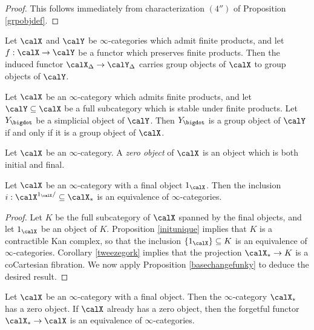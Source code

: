 \begin{proof}
This follows immediately from characterization $(4'')$ of Proposition \ref{grpobjdef}.
\end{proof}

\begin{corollary}\label{grpstable}
Let $\calX$ and $\calY$ be $\infty$-categories which admit finite products, and let
$f: \calX \rightarrow \calY$ be a functor which preserves finite products. Then
the induced functor $\calX_{\Delta} \rightarrow \calY_{\Delta}$ carries group objects
of $\calX$ to group objects of $\calY$.
\end{corollary}

\begin{corollary}
Let $\calX$ be an $\infty$-category which admits finite products, and let $\calY \subseteq \calX$ be a full subcategory which is stable under finite products. Let $Y_{\bigdot}$ be a simplicial
object of $\calY$. Then $Y_{\bigdot}$ is a group object of $\calY$ if and only if it is a group object of $\calX$. 
\end{corollary}

\begin{definition}
Let $\calX$ be an $\infty$-category. A {\it zero object} of $\calX$ is an object which is both initial and final.
\end{definition}

\begin{lemma}\label{pointer}
Let $\calX$ be an $\infty$-category with a final object $1_{\calX}$. Then the inclusion
$i: \calX^{1_{\calX}/} \subseteq \calX_{\ast}$ is an equivalence of $\infty$-categories.
\end{lemma}

\begin{proof}
Let $K$ be the full subcategory of $\calX$ spanned by the final objects, and let
$1_{\calX}$ be an object of $K$. Proposition \ref{initunique} implies that $K$ is a contractible Kan complex, so that the inclusion $\{1_{\calX} \} \subseteq K$ is an equivalence of $\infty$-categories.
Corollary \ref{tweezegork} implies that the projection 
$\calX_{\ast} \rightarrow K$ is a coCartesian fibration. We now apply Proposition \ref{basechangefunky} to deduce the desired result.
\end{proof}

\begin{lemma}\label{pointerprime}
Let $\calX$ be an $\infty$-category with a final object. Then the $\infty$-category
$\calX_{\ast}$ has a zero object. If $\calX$ already has a zero object, then the forgetful functor
$\calX_{\ast} \rightarrow \calX$ is an equivalence of $\infty$-categories.
\end{lemma}

